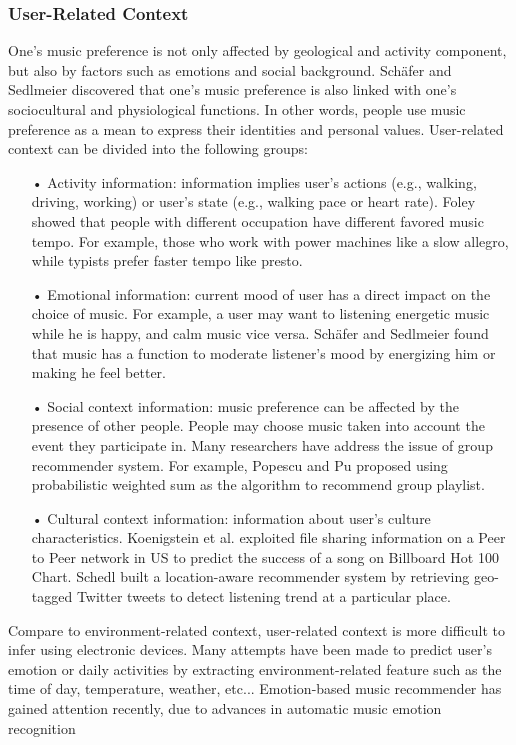\subsubsection{User-Related Context}
One's music preference is not only affected by geological and activity component, but also by factors such as emotions and social background. Sch{\"a}fer and Sedlmeier \cite{schafer2009functions} discovered that one's music preference is also linked with one's sociocultural and physiological functions. In other words, people use music preference as a mean to express their identities and personal values. User-related context can be divided into the following groups:

\begin{itemize}
\item[•] Activity information: information implies user's actions (e.g., walking, driving, working) or user's state (e.g., walking pace or heart rate). Foley \cite{foley1940occupational} showed that people with different occupation have different favored music tempo. For example, those who work with power machines like a slow allegro, while typists prefer faster tempo like presto. 
\item[•] Emotional information: current mood of user has a direct impact on the choice of music. For example, a user may want to listening energetic music while he is happy, and calm music vice versa. Sch{\"a}fer and Sedlmeier \cite{schafer2009functions} found that music has a function to moderate listener's mood by energizing him or making he feel better.
\item[•] Social context information: music preference can be affected by the presence of other people. People may choose music taken into account the event they participate in. Many researchers have address the issue of group recommender system. For example, Popescu and Pu \cite{popescu2011probabilistic} proposed using probabilistic weighted sum as the algorithm to recommend group playlist.
\item[•] Cultural context information: information about user's culture characteristics. Koenigstein et al. \cite{koenigstein2009predicting} exploited file sharing information on a Peer to Peer network in US to predict the success of a song on Billboard Hot 100 Chart. Schedl \cite{schedl2013leveraging} built a location-aware recommender system by retrieving geo-tagged Twitter tweets to detect listening trend at a particular place. 
\end{itemize}

Compare to environment-related context, user-related context is more difficult to infer using electronic devices. Many attempts have been made to predict user's emotion or daily activities \cite{park2006context} \cite{wang2012context} by extracting environment-related feature such as the time of day, temperature, weather, etc... Emotion-based music recommender has gained attention recently, due to advances in automatic music emotion recognition \cite{yang2012machine}




